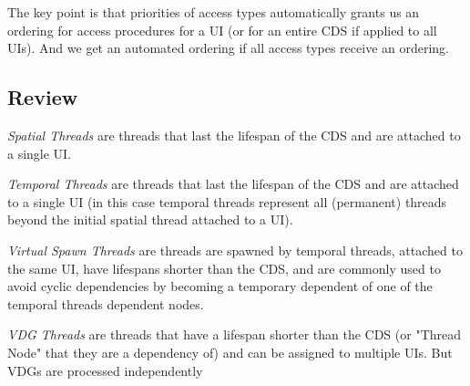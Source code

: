 The key point is that priorities of access types automatically grants us an ordering for access procedures for a UI (or for an entire CDS if applied to all UIs). And we get an automated ordering if all access types receive an ordering.

\subsection{Review}

\begin{con-def}
	\label{spatial-threads}
	\textit{Spatial Threads} are threads that last the lifespan of the CDS and are attached to a single UI.
\end{con-def}

\begin{con-def}
	\label{temporal-threads}
	\textit{Temporal Threads} are threads that last the lifespan of the CDS and are attached to a single UI (in this case temporal threads represent all (permanent) threads beyond the initial spatial thread attached to a UI).
\end{con-def}

\begin{con-def}
	\label{temporal-threads}
	\textit{Virtual Spawn Threads} are threads are spawned by temporal threads, attached to the same UI, have lifespans shorter than the CDS, and are commonly used to avoid cyclic dependencies by becoming a temporary dependent of one of the temporal threads dependent nodes.
\end{con-def}

\begin{con-def}
	\label{virtual-threads}
	\textit{VDG Threads} are threads that have a lifespan shorter than the CDS (or "Thread Node" that they are a dependency of) and can be assigned to multiple UIs. But VDGs are processed independently
\end{con-def}